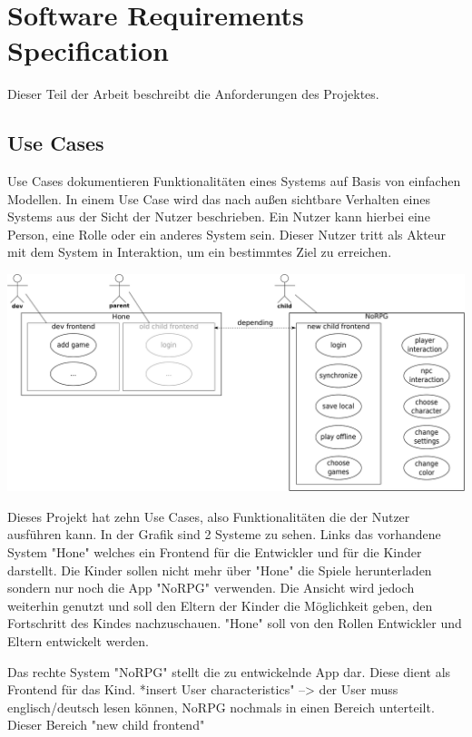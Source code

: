 \chapter{Software Requirements Specification}
Dieser Teil der Arbeit beschreibt die Anforderungen des Projektes.

\section{Use Cases}
	Use Cases dokumentieren Funktionalitäten eines Systems auf Basis von einfachen Modellen. In einem Use Case wird das nach außen sichtbare Verhalten eines Systems aus der Sicht der Nutzer beschrieben. Ein Nutzer kann hierbei eine Person, eine Rolle oder ein anderes System sein. Dieser Nutzer tritt als Akteur mit dem System in Interaktion, um ein bestimmtes Ziel zu erreichen.
	
	\begin{center}
		\includegraphics[width=\textwidth]{pics/OUCD.pdf}
	\end{center}
	
	Dieses Projekt hat zehn Use Cases, also Funktionalitäten die der Nutzer ausführen kann. In der Grafik sind 2 Systeme zu sehen. Links das vorhandene System "Hone" welches ein Frontend für die Entwickler und für die Kinder darstellt. Die Kinder sollen nicht mehr über "Hone" die Spiele herunterladen sondern nur noch die App "NoRPG" verwenden. Die Ansicht wird jedoch weiterhin genutzt und soll den Eltern der Kinder die Möglichkeit geben, den Fortschritt des Kindes nachzuschauen. "Hone" soll von den Rollen Entwickler und Eltern entwickelt werden.
	
	Das rechte System "NoRPG" stellt die zu entwickelnde App dar. Diese dient als Frontend für das Kind. *insert User characteristics" --> der User muss englisch/deutsch lesen können, 
	NoRPG nochmals in einen Bereich unterteilt. Dieser Bereich "new child frontend" 
	
